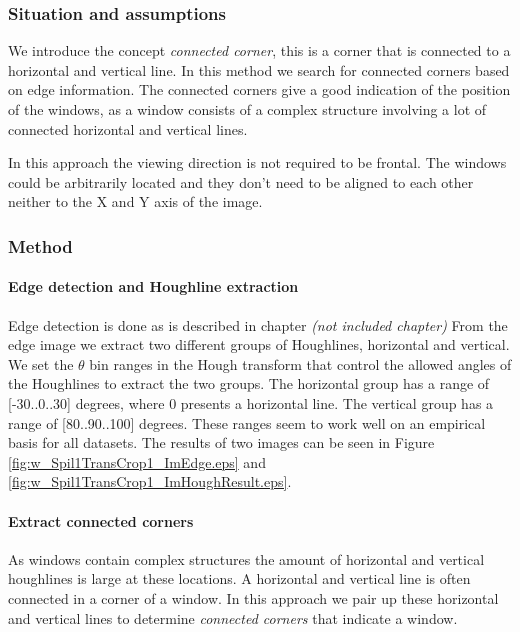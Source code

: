 
\subsubsection{Situation and assumptions}
We introduce the concept \emph{connected corner}, this is a corner that is 
connected to a horizontal and vertical line.  
In this method we search for connected corners based on edge information.
The connected corners give a good indication of the position of the windows, as 
a window consists of a complex structure involving a lot of connected horizontal
and vertical lines. 

In this approach the viewing direction is not required to be frontal.
The windows could be arbitrarily located and they don't need
to be aligned to each other neither to the X and Y axis of the image.


\subsubsection{Method}
\paragraph{Edge detection and Houghline extraction}
Edge detection is done as is described in chapter 
\emph{(not included chapter)} %
From the edge image we extract two different groups of Houghlines, horizontal and %
vertical.  We set the $\theta$ bin ranges in the Hough transform that control the
allowed angles of the Houghlines to extract the two groups. The horizontal group
has a range of [-30..0..30] degrees, where 0 presents a horizontal line. The vertical
group has a range of [80..90..100] degrees. These ranges seem
to work well on an empirical basis for all datasets.
The results of two images can be seen in Figure \ref{fig:w_Spil1TransCrop1_ImEdge.eps} and
 \ref{fig:w_Spil1TransCrop1_ImHoughResult.eps}.

\paragraph{Extract connected corners}
 As windows contain complex structures
the amount of horizontal and vertical houghlines is large at these locations.
A horizontal and vertical line is often connected in a corner of a window.  In
this approach we pair up these horizontal and vertical lines to determine
\emph{connected corners} that indicate a window.

